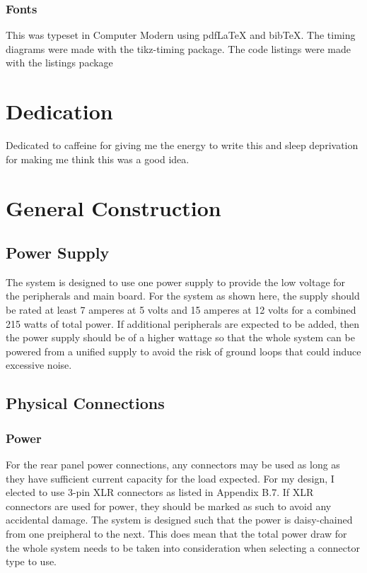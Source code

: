 \documentclass{book}
\begin{document}
\subsection*{Fonts}
This was typeset in Computer Modern using pdf\LaTeX{} and bib\TeX{}.
The timing diagrams were made with the tikz-timing package.
The code listings were made with the listings package
\chapter*{Dedication}
Dedicated to caffeine for giving me the energy to write this and sleep deprivation for making me think this was a good idea.
\tableofcontents
\listoffigures
\listoftables
\mainmatter
\chapter{General Construction}
\section{Power Supply}
The system is designed to use one power supply to provide the low voltage for the peripherals and main board. For the system as shown here, the supply 
should be rated at least 7 amperes at 5 volts and 15 amperes at 12 volts for a combined 215 watts of total power. If additional peripherals are expected to 
be added, then the power supply should be of a higher wattage so that the whole system can be powered from a unified supply to avoid the risk of ground 
loops that could induce excessive noise.

\section{Physical Connections}
\subsection{Power}
For the rear panel power connections, any connectors may be used as long as they have sufficient current capacity for the load expected. For my design, I 
elected to use 3-pin XLR connectors as listed in Appendix B.7. If XLR connectors are used for power, they should be marked as such to avoid any 
accidental damage. The system is designed such that the power is daisy-chained from one preipheral to the next. This does mean that the total power 
draw for the whole system needs to be taken into consideration when selecting a connector type to use.
\end{document}
